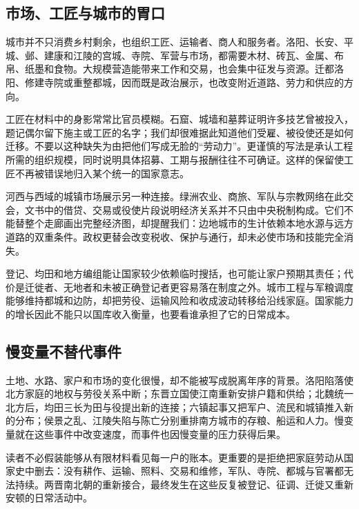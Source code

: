 \subsection{市场、工匠与城市的胃口}

城市并不只消费乡村剩余，也组织工匠、运输者、商人和服务者。洛阳、长安、平城、邺、建康和江陵的宫城、寺院、军营与市场，都需要木材、砖瓦、金属、布帛、纸墨和食物。大规模营造能带来工作和交易，也会集中征发与资源。迁都洛阳、修建寺院或重整都城，因而既是政治展示，也改变附近道路、劳力和供应的方向。

工匠在材料中的身影常常比官员模糊。石窟、城墙和墓葬证明许多技艺曾被投入，题记偶尔留下施主或工匠的名字；我们却很难据此知道他们受雇、被役使还是如何迁移。不要以这种缺失为由把他们写成无脸的“劳动力”。更谨慎的写法是承认工程所需的组织规模，同时说明具体招募、工期与报酬往往不可确证。这样的保留使工匠不再被错误地归入某个统一的国家意志。

河西与西域的城镇市场展示另一种连接。绿洲农业、商旅、军队与宗教网络在此交会，文书中的借贷、交易或役使片段说明经济关系并不只由中央税制构成。它们不能替整个走廊画出完整经济图，却提醒我们：边地城市的生计依赖本地水源与远方道路的双重条件。政权更替会改变税收、保护与通行，却未必使市场和技能完全消失。

\begin{causalchain}
登记、均田和地方编组能让国家较少依赖临时搜括，也可能让家户预期其责任；代价是迁徙者、无地者和未被正确登记者更容易落在制度之外。城市工程与军粮调度能够维持都城和边防，却把劳役、运输风险和收成波动转移给沿线家庭。国家能力的增长因此不能只以国库收入衡量，也要看谁承担了它的日常成本。
\end{causalchain}

\subsection{慢变量不替代事件}

土地、水路、家户和市场的变化很慢，却不能被写成脱离年序的背景。洛阳陷落使北方家庭的地权与劳役关系中断；东晋立国使江南重新安排户籍和供给；北魏统一北方后，均田三长为田与役提出新的连接；六镇起事又把军户、流民和城镇推入新的分布；侯景之乱、江陵失陷与陈亡分别重排南方城市的存粮、船运和人力。慢变量就在这些事件中改变速度，而事件也因慢变量的压力获得后果。

读者不必假装能够从有限材料看见每一户的账本。更重要的是拒绝把家庭劳动从国家史中删去：没有耕作、运输、照料、交易和维修，军队、寺院、都城与官署都无法持续。两晋南北朝的重新接合，最终发生在这些反复被登记、征调、迁徙又重新安顿的日常活动中。
